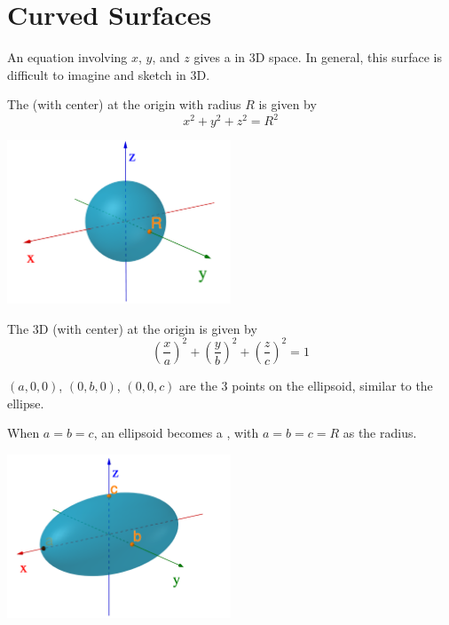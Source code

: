 \documentclass[11pt,fleqn]{book} %
\begin{document}
\section{Curved Surfaces}

An equation involving $x$, $y$, and $z$ gives a  in 3D space. In general, this surface is difficult to imagine and sketch in 3D.

\begin{definition}[3D Sphere]
    The  (with center) at the origin with radius $R$ is given by $$x^2 + y^2 + z^2 = R^2$$
\end{definition}

\begin{center} \includegraphics[width=0.5\textwidth]{Plots/sphere.png} \end{center}

\begin{definition}[Ellipsoid]
    The 3D  (with center) at the origin is given by $$\left(\frac{x}{a}\right)^2 + \left(\frac{y}{b}\right)^2 + \left(\frac{z}{c}\right)^2 = 1$$

    $(a, 0, 0)$, $(0, b, 0)$, $(0, 0, c)$ are the 3 points on the ellipsoid, similar to the ellipse.

    When $a = b = c$, an ellipsoid becomes a , with $a = b = c = R$ as the radius.
\end{definition}

\begin{center} \includegraphics[width=0.5\textwidth]{Plots/ellipsoid.png} \end{center}
\end{document}
